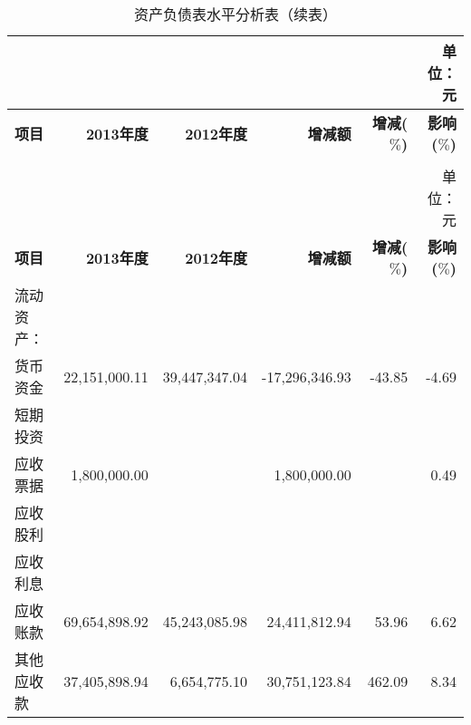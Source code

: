 \renewcommand*{\arraystretch}{0.6}
\setlength{\tabcolsep}{8pt}
\begin{longtable}{>{\scriptsize}p{8em}>{\scriptsize}r>{\scriptsize}r>{\scriptsize}r>{\scriptsize}r>{\scriptsize}r}
\caption[资产负债表水平分析表]{资产负债表水平分析表}\\  %
&&&&& {\scriptsize 单位：元}\\
\hline\hline
\rowcolor{mycyan} {\bfseries \scriptsize 项目} & {\bfseries \scriptsize 2013年度}\hspace{2ex} & {\bfseries \scriptsize  2012年度}\hspace{2ex} &  {\bfseries \scriptsize 增减额}\hspace{4ex}      & {\bfseries \scriptsize 增减($\%$)}  & {\bfseries \scriptsize 影响($\%$)}\\  \endfirsthead          %
\caption[]{资产负债表水平分析表（续表）} \\ 
&&&&& {\scriptsize 单位：元}\\                        %
\hline\hline
\rowcolor{mycyan} {\bfseries \scriptsize 项目} & {\bfseries \scriptsize 2013年度}\hspace{2ex} & {\bfseries \scriptsize  2012年度}\hspace{2ex} &  {\bfseries \scriptsize 增减额}\hspace{4ex}      & {\bfseries \scriptsize 增减($\%$)}  & {\bfseries \scriptsize 影响($\%$)}\\  \endhead                %
\hline
\endfoot
\hline   %
流动资产：    & 	 &  &  &  & 	\\	
    \hspace{2ex}货币资金 & 22,151,000.11 & 39,447,347.04 & -17,296,346.93 & -43.85 & -4.69\\
    \hspace{2ex}短期投资 &  &  &  &  & 					\\
    \hspace{2ex}应收票据 & 1,800,000.00  &  & 1,800,000.00 &  & 0.49\\
    \hspace{2ex}应收股利  &  &  &  &  & 					\\
    \hspace{2ex}应收利息 &  &  &  &  & 					\\
  \hspace{2ex}应收账款 & 69,654,898.92 & 45,243,085.98 & 24,411,812.94 & 53.96 & 6.62\\
    \hspace{2ex}其他应收款 & 37,405,898.94 & 6,654,775.10 & 30,751,123.84 & 462.09 & 8.34\\

\end{longtable}
